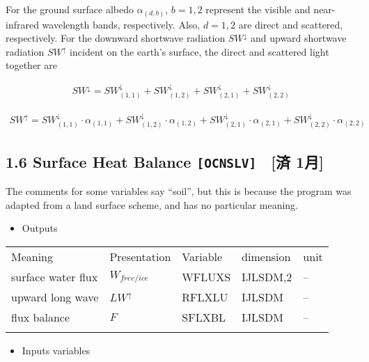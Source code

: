 For the ground surface albedo \(\alpha_{(d,b)}\), \(b=1,2\) represent
the visible and near-infrared wavelength bands, respectively. Also,
\(d=1,2\) are direct and scattered, respectively. For the downward
shortwave radiation \(SW^\downarrow\) and upward shortwave radiation
\(SW^\uparrow\) incident on the earth's surface, the direct and
scattered light together are

\begin{eqnarray}
    SW^\downarrow = SW^\downarrow_{(1,1)}+SW^\downarrow_{(1,2)}+SW^\downarrow_{(2,1)}+SW^\downarrow_{(2,2)}
\end{eqnarray}

\begin{eqnarray}
SW^\uparrow = SW^\downarrow_{(1,1)}\cdot\alpha_{(1,1)}+SW^\downarrow_{(1,2)}\cdot\alpha_{(1,2)}+SW^\downarrow_{(2,1)}\cdot\alpha_{(2,1)}+SW^\downarrow_{(2,2)}\cdot\alpha_{(2,2)}
\end{eqnarray}

\hypertarget{surface-heat-balance-ocnslv-ux6e08-1ux6708}{%
\subsection{\texorpdfstring{1.6 Surface Heat Balance
\texttt{{[}OCNSLV{]}}　{[}済
1月{]}}{1.6 Surface Heat Balance {[}OCNSLV{]}　{[}済 1月{]}}}\label{surface-heat-balance-ocnslv-ux6e08-1ux6708}}

The comments for some variables say ``soil'', but this is because the
program was adapted from a land surface scheme, and has no particular
meaning.

\begin{itemize}
\tightlist
\item
  Outputs
\end{itemize}

\setlength\LTleft{0pt}\setlength\LTright{0pt}\begin{longtable}[]{@{}lllll@{}}
\toprule\relax
Meaning & Presentation & Variable & dimension & unit \\ \addlinespace
\midrule\relax
\endhead
surface water flux & \(W_{free/ice}\) & WFLUXS & IJLSDM,2 &
-- \\ \addlinespace
upward long wave & \(LW^\uparrow\) & RFLXLU & IJLSDM &
-- \\ \addlinespace
flux balance & \(F\) & SFLXBL & IJLSDM & -- \\ \addlinespace
\bottomrule
\end{longtable}

\begin{itemize}
\tightlist
\item
  Inputs variables
\end{itemize}

